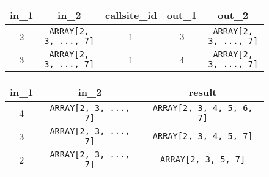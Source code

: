 \begin{figure}[h]
    \centering\footnotesize
    \begin{minipage}[b]{\linewidth}
    \centering
    \begin{tabular}{c|c|c|c|c}
         in\_1 & in\_2                                     & callsite\_id & out\_1 & out\_2                                  \\\hline
         2     & \texttt{ARRAY[2, 3, ..., 7]} & 1            & 3      & \texttt{ARRAY[2, 3, ..., 7]}\\
         3     & \texttt{ARRAY[2, 3, ..., 7]} & 1            & 4      & \texttt{ARRAY[2, 3, ..., 7]}\\
    \end{tabular}
    \label{}
    \end{minipage}
    \vspace{5mm}
    \begin{minipage}[b]{\linewidth}
    \centering
    \begin{tabular}{c|c|c}
         in\_1 & in\_2                                     & result                                  \\\hline
         4     & \texttt{ARRAY[2, 3, ..., 7]} & \texttt{ARRAY[2, 3, 4, 5, 6, 7]}\\
         3     & \texttt{ARRAY[2, 3, ..., 7]} & \texttt{ARRAY[2, 3, 4, 5, 7]}\\
         2     & \texttt{ARRAY[2, 3, ..., 7]} & \texttt{ARRAY[2, 3, 5, 7]}\\
    \end{tabular}
    \label{}
    \end{minipage}
    \caption{}
    \label{}
\end{figure}

